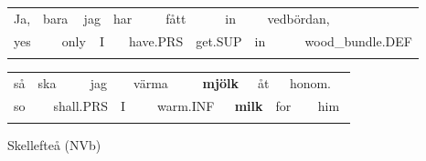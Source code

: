 \begin{tabular}{llllllllllllll}
\lsptoprule
Ja, & \multicolumn{2}{l}{bara

} & \multicolumn{2}{l}{jag

} & \multicolumn{2}{l}{har

} & \multicolumn{2}{l}{fått

} & \multicolumn{2}{l}{in

} & \multicolumn{2}{l}{vedbördan,

} & \\
\multicolumn{2}{l}{yes

} & \multicolumn{2}{l}{only

} & \multicolumn{2}{l}{I

} & \multicolumn{2}{l}{have.PRS

} & \multicolumn{2}{l}{get.SUP

} & \multicolumn{2}{l}{in

} & \multicolumn{2}{l}{wood\_bundle.DEF

}\\
\lspbottomrule
\end{tabular}

\begin{tabular}{llllllllllllll}
\lsptoprule
så & \multicolumn{2}{l}{ska

} & \multicolumn{2}{l}{jag

} & \multicolumn{2}{l}{värma

} & \multicolumn{2}{l}{{\bfseries mjölk}

} & \multicolumn{2}{l}{åt

} & \multicolumn{2}{l}{honom.

} & \\
\multicolumn{2}{l}{so

} & \multicolumn{2}{l}{shall.PRS

} & \multicolumn{2}{l}{I

} & \multicolumn{2}{l}{warm.INF

} & \multicolumn{2}{l}{{\bfseries milk}

} & \multicolumn{2}{l}{for

} & \multicolumn{2}{l}{him

}\\
\lspbottomrule
\end{tabular}

\begin{styleExLtrTblii}
\label{bkm:Ref110672187}Skellefteå (NVb)

\end{styleExLtrTblii}

